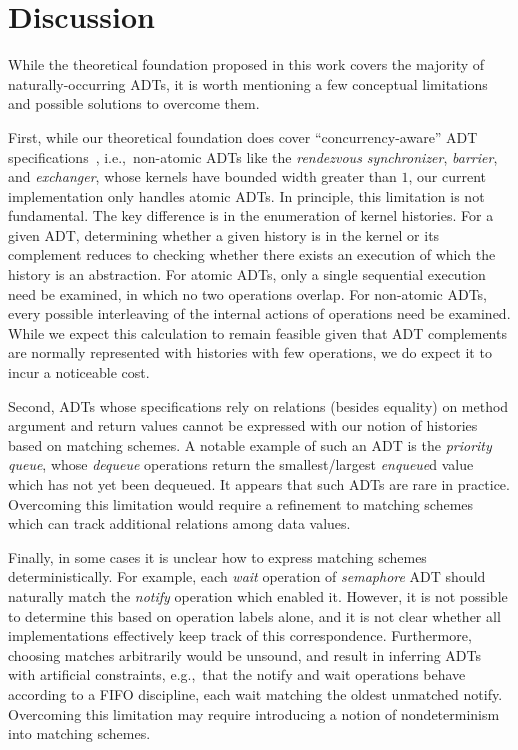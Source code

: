 \section{Discussion}
\label{sec:discussion}

While the theoretical foundation proposed in this work covers the majority of
naturally-occurring ADTs, it is worth mentioning a few conceptual limitations
and possible solutions to overcome them.

First, while our theoretical foundation does cover “concurrency-aware” ADT
specifications~\cite{conf/podc/HemedR14}, i.e.,~non-atomic ADTs like the
\emph{rendezvous synchronizer}, \emph{barrier}, and \emph{exchanger}, whose
kernels have bounded width greater than $1$, our current implementation only
handles atomic ADTs. In principle, this limitation is not fundamental. The key
difference is in the enumeration of kernel histories. For a given ADT,
determining whether a given history is in the kernel or its complement reduces
to checking whether there exists an execution of which the history is an
abstraction. For atomic ADTs, only a single sequential execution need be
examined, in which no two operations overlap. For non-atomic ADTs, every
possible interleaving of the internal actions of operations need be examined.
While we expect this calculation to remain feasible given that ADT complements
are normally represented with histories with few operations, we do expect it to
incur a noticeable cost.

Second, ADTs whose specifications rely on relations (besides equality) on
method argument and return values cannot be expressed with our notion of
histories based on matching schemes. A notable example of such an ADT is the
\emph{priority queue}, whose \emph{dequeue} operations return the
smallest/largest \emph{enqueue}d value which has not yet been dequeued. It
appears that such ADTs are rare in practice. Overcoming this limitation would
require a refinement to matching schemes which can track additional relations
among data values.

Finally, in some cases it is unclear how to express matching schemes
deterministically. For example, each \emph{wait} operation of \emph{semaphore}
ADT should naturally match the \emph{notify} operation which enabled it.
However, it is not possible to determine this based on operation labels alone,
and it is not clear whether all implementations effectively keep track of this
correspondence. Furthermore, choosing matches arbitrarily would be unsound, and
result in inferring ADTs with artificial constraints, e.g.,~that the notify and
wait operations behave according to a FIFO discipline, each wait matching the
oldest unmatched notify. Overcoming this limitation may require introducing a
notion of nondeterminism into matching schemes.
